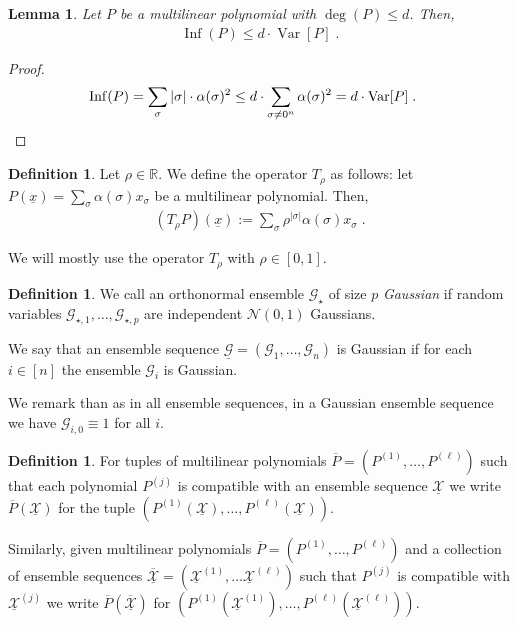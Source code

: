 \documentclass{daj}
\newcommand{\1}{\mathbbm{1}}
\theoremstyle{plain}
\newtheorem{lemma}[theorem]{Lemma}
\theoremstyle{definition}
\newtheorem{definition}[theorem]{Definition}
\DeclareMathOperator*{\Var}{Var}
\DeclareMathOperator{\Inf}{Inf}
\begin{document}
\begin{lemma}
\label{lem:influence-vs-variance}
Let $P$ be a multilinear polynomial with $\deg(P) \le d$. Then,
\begin{align*}
\Inf(P) \le d \cdot \Var[P] \; .
\end{align*}
\end{lemma}
\begin{proof}
\begin{align*}
\Inf(P) &= \sum_{\sigma} |\sigma| \cdot \alpha(\sigma)^2 
\le d \cdot \sum_{\sigma \ne 0^n} \alpha(\sigma)^2 = d \cdot \Var[P] \; .
\qedhere
\end{align*}
\end{proof}

\begin{definition}
\label{def:t-rho}
Let $\rho \in \mathbb{R}$. We define the operator $T_\rho$ as follows:
let $P(\underline{x}) = \sum_{\sigma} \alpha(\sigma) x_\sigma$ be a multilinear 
polynomial. Then,
\begin{align*}
(T_\rho P)(\underline{x}) := 
\sum_{\sigma} \rho^{|\sigma|} \alpha(\sigma) x_\sigma \; .
\end{align*}
\end{definition}

We will mostly use the operator $T_\rho$ with $\rho \in [0, 1]$.

\begin{definition}
\label{def:gaussian-ensemble}
We call an orthonormal ensemble $\mathcal{G}_\star$ of size $p$
\emph{Gaussian} if random variables 
$\mathcal{G}_{\star,1}, \ldots, \mathcal{G}_{\star, p}$
are independent $\mathcal{N}(0, 1)$ Gaussians.

We say that an ensemble sequence
$\underline{\mathcal{G}} = (\mathcal{G}_1, \ldots, \mathcal{G}_n)$ 
is Gaussian if for each $i \in [n]$ the ensemble $\mathcal{G}_i$
is Gaussian.
\end{definition}

We remark than as in all ensemble sequences, in a Gaussian ensemble sequence
we have $\mathcal{G}_{i,0} \equiv 1$ for all $i$.

\begin{definition}
For tuples of multilinear polynomials $\overline{P} = (P^{(1)}, \ldots, \allowbreak P^{(\ell)})$
such that each polynomial $P^{(j)}$ is 
compatible with an ensemble sequence $\underline{\mathcal{X}}$ we write
$\overline{P}(\underline{\mathcal{X}})$ for the tuple 
$(P^{(1)}(\underline{\mathcal{X}}), \ldots, P^{(\ell)}(\underline{\mathcal{X}}))$.

Similarly, given multilinear polynomials 
$\overline{P} = (P^{(1)}, \ldots, P^{(\ell)})$ and a collection of ensemble
sequences
$\overline{\underline{\mathcal{X}}} = (\underline{\mathcal{X}}^{(1)}, \ldots
\underline{\mathcal{X}}^{(\ell)})$ such that
$P^{(j)}$ is compatible with $\underline{\mathcal{X}}^{(j)}$ we write
$\overline{P}(\overline{\underline{\mathcal{X}}})$ for
$(P^{(1)}(\underline{\mathcal{X}}^{(1)}), \ldots, 
P^{(\ell)}(\underline{\mathcal{X}}^{(\ell)}))$.
\end{definition}
\end{document}

